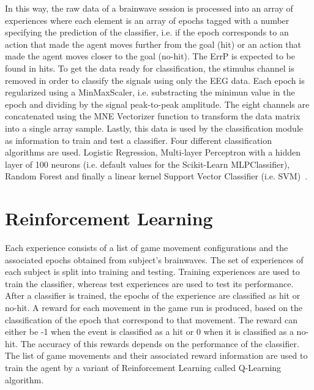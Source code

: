 \documentclass[journal]{IEEEtran}
\begin{document}
{In this way, the raw data of a brainwave session is processed into an array of experiences where each element is an array of epochs tagged with a number specifying the prediction of the classifier, i.e. if the epoch corresponds to an action that made the agent moves further from the goal (hit) or an action that made the agent moves closer to the goal (no-hit). The ErrP is expected to be found in hits. To get the data ready for classification, the stimulus channel is removed in order to classify the signals using only the EEG data. Each epoch is regularized using a MinMaxScaler, i.e. substracting the minimun value in the epoch and dividing by the signal peak-to-peak amplitude.  The eight channels are concatenated using the  MNE Vectorizer function to transform the data matrix into a single array sample. Lastly, this data is used by the classification module as information to train and test a classifier. Four different classification algorithms are used.  Logistic Regression, Multi-layer Perceptron with a hidden layer of 100 neurons (i.e. default values for the Scikit-Learn MLPClassifier), Random Forest and finally a linear kernel Support Vector Classifier (i.e. SVM)~\cite{Lotte2018}.  




\section{Reinforcement Learning}
\label{learning}

Each experience consists of a list of game movement configurations and the associated epochs obtained from subject's brainwaves.  The set of experiences of each subject is split into training and testing.  Training experiences are used to train the classifier, whereas test experiences are used to test its performance.  After a classifier is trained, the epochs of the experience are classified as hit or no-hit.  A reward for each movement in the game run is produced, based on the classification of the epoch that correspond to that movement.  The reward can either be -1 when the event is classified as a hit or 0 when it is classified as a no-hit. The accuracy of this rewards depends on the performance of the classifier. The list of game movements and their associated reward information are used to train the agent by a variant of Reinforcement Learning called Q-Learning algorithm.

}
\end{document}
